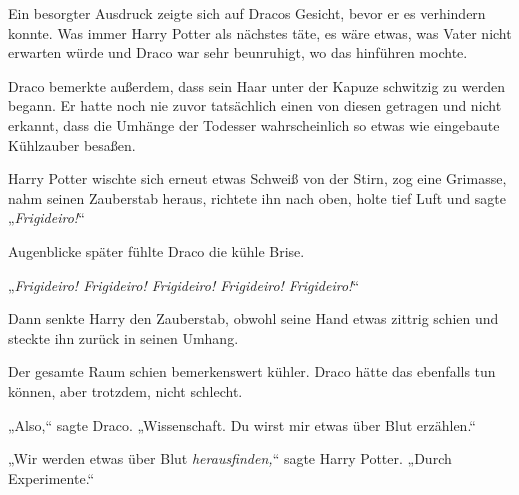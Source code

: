 Ein besorgter Ausdruck zeigte sich auf Dracos Gesicht, bevor er es verhindern konnte. Was immer Harry Potter als nächstes täte, es wäre etwas, was Vater nicht erwarten würde und Draco war sehr beunruhigt, wo das hinführen mochte.

Draco bemerkte außerdem, dass sein Haar unter der Kapuze schwitzig zu werden begann. Er hatte noch nie zuvor tatsächlich einen von diesen getragen und nicht erkannt, dass die Umhänge der Todesser wahrscheinlich so etwas wie eingebaute Kühlzauber besaßen.

Harry Potter wischte sich erneut etwas Schweiß von der Stirn, zog eine Grimasse, nahm seinen Zauberstab heraus, richtete ihn nach oben, holte tief Luft und sagte „\emph{Frigideiro!}“

Augenblicke später fühlte Draco die kühle Brise.

„\emph{Frigideiro! Frigideiro! Frigideiro! Frigideiro! Frigideiro!}“

Dann senkte Harry den Zauberstab, obwohl seine Hand etwas zittrig schien und steckte ihn zurück in seinen Umhang.

Der gesamte Raum schien bemerkenswert kühler. Draco hätte das ebenfalls tun können, aber trotzdem, nicht schlecht.

„Also,“ sagte Draco. „Wissenschaft. Du wirst mir etwas über Blut erzählen.“

„Wir werden etwas über Blut \emph{herausfinden,}“ sagte Harry Potter. „Durch Experimente.“

